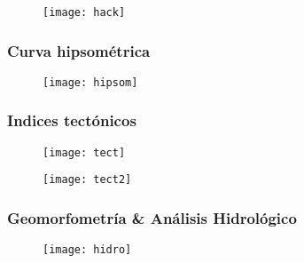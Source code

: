 \documentclass[14pt]{beamer}
\begin{document}
\begin{frame}
  \begin{figure}
    \centering
    \texttt{[image: hack]}
  \end{figure}
\tiny{}
\end{frame}
\begin{frame}
\frametitle{Curva hipsométrica}
  \begin{figure}
    \centering
    \texttt{[image: hipsom]}
  \end{figure}
\tiny{}
\end{frame}
\begin{frame}
\frametitle{Indices tectónicos}
  \begin{figure}
    \centering
    \texttt{[image: tect]}
  \end{figure}
\tiny{}
\end{frame}
\begin{frame}
  \begin{figure}
    \centering
    \texttt{[image: tect2]}
  \end{figure}
\tiny{}
\end{frame}
\begin{frame}
\frametitle{Geomorfometría \& Análisis Hidrológico}
  \begin{figure}
    \centering
    \texttt{[image: hidro]}
  \end{figure}
\end{frame}
\end{document}
